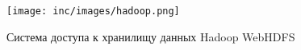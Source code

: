 \begin{figure}[ht!]
    \centering
    \texttt{[image: inc/images/hadoop.png]}
    \caption{Система доступа к хранилищу данных Hadoop WebHDFS}\label{img:hadoop}
\end{figure}